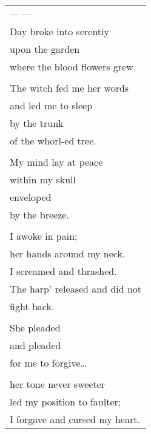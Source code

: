 \documentclass{article}
\begin{document}
\begin{tabular}{l}
\\
--- --- \\
Day broke into serentiy \\
upon the garden \\
where the blood flowers grew. \\
\\
The witch fed me her words \\
and led me to sleep \\
by the trunk \\
of the whorl-ed tree. \\
\\
My mind lay at peace \\
within my skull \\
enveloped \\
by the breeze. \\
\\
I awoke in pain; \\
her hands around my neck. \\
I screamed and thrashed. \\
The harp' released and did not \\
fight back. \\
\\
She pleaded \\
and pleaded \\
for me to forgive\ldots{} \\
\\
her tone never sweeter \\
led my position to faulter; \\
I forgave and cursed my heart. \\
\end{tabular} \\
\end{document}
